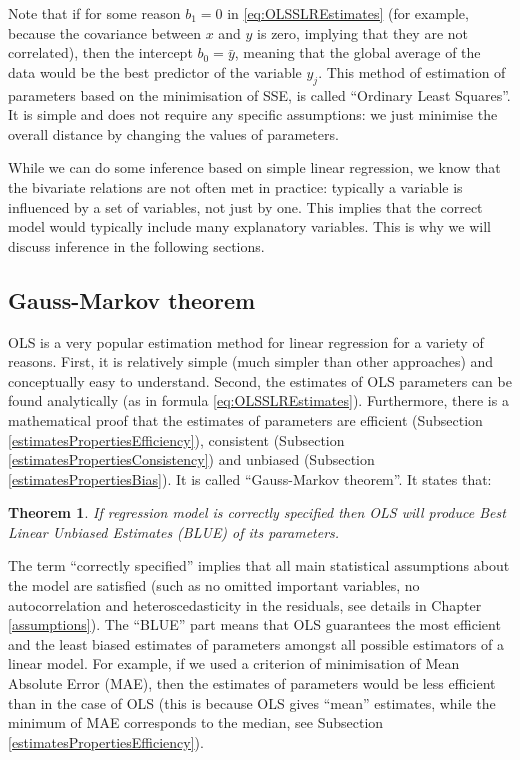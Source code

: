 \documentclass[
]{book}
\newtheorem{theorem}{Theorem}[chapter]
\theoremstyle{definition}
\theoremstyle{definition}
\theoremstyle{definition}
\theoremstyle{definition}
\theoremstyle{remark}
\begin{document}
Note that if for some reason \({b}_1=0\) in \eqref{eq:OLSSLREstimates} (for example, because the covariance between \(x\) and \(y\) is zero, implying that they are not correlated), then the intercept \({b}_0 = \bar{y}\), meaning that the global average of the data would be the best predictor of the variable \(y_j\). This method of estimation of parameters based on the minimisation of SSE, is called ``Ordinary Least Squares''. It is simple and does not require any specific assumptions: we just minimise the overall distance by changing the values of parameters.

While we can do some inference based on simple linear regression, we know that the bivariate relations are not often met in practice: typically a variable is influenced by a set of variables, not just by one. This implies that the correct model would typically include many explanatory variables. This is why we will discuss inference in the following sections.

\hypertarget{GaussMarkov}{%
\subsection{Gauss-Markov theorem}\label{GaussMarkov}}

OLS is a very popular estimation method for linear regression for a variety of reasons. First, it is relatively simple (much simpler than other approaches) and conceptually easy to understand. Second, the estimates of OLS parameters can be found analytically (as in formula \eqref{eq:OLSSLREstimates}). Furthermore, there is a mathematical proof that the estimates of parameters are efficient (Subsection \ref{estimatesPropertiesEfficiency}), consistent (Subsection \ref{estimatesPropertiesConsistency}) and unbiased (Subsection \ref{estimatesPropertiesBias}). It is called ``Gauss-Markov theorem''. It states that:

\begin{theorem}
If regression model is correctly specified then OLS will produce Best Linear Unbiased Estimates (BLUE) of its parameters.
\end{theorem}

The term ``correctly specified'' implies that all main statistical assumptions about the model are satisfied (such as no omitted important variables, no autocorrelation and heteroscedasticity in the residuals, see details in Chapter \ref{assumptions}). The ``BLUE'' part means that OLS guarantees the most efficient and the least biased estimates of parameters amongst all possible estimators of a linear model. For example, if we used a criterion of minimisation of Mean Absolute Error (MAE), then the estimates of parameters would be less efficient than in the case of OLS (this is because OLS gives ``mean'' estimates, while the minimum of MAE corresponds to the median, see Subsection \ref{estimatesPropertiesEfficiency}).
\end{document}
